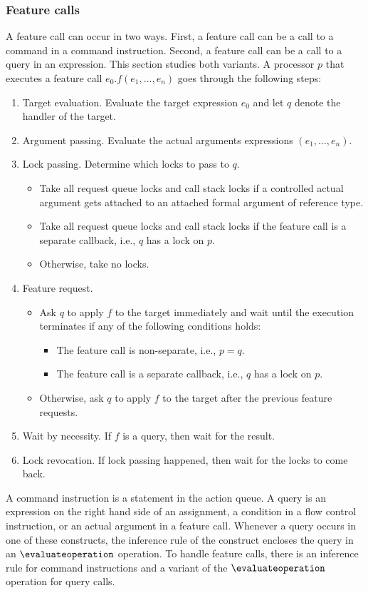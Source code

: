 \subsubsection{Feature calls}\label{sec:feature calls}
A feature call can occur in two ways. First, a feature call can be a call to a command in a command instruction. Second, a feature call can be a call to a query in an expression. This section studies both variants. A processor $p$ that executes a feature call $e_{0}.f(e_{1}, \ldots, e_{n})$ goes through the following steps:
\begin{enumerate}
	\item Target evaluation. Evaluate the target expression $e_{0}$ and let $q$ denote the handler of the target.
	\item Argument passing. Evaluate the actual arguments expressions $(e_{1}, \ldots, e_{n})$.
	\item Lock passing. Determine which locks to pass to $q$.
		\begin{itemize}
			\item Take all request queue locks and call stack locks if a controlled actual argument gets attached to an attached formal argument of reference type.
			\item Take all request queue locks and call stack locks if the feature call is a separate callback, i.e., $q$ has a lock on $p$.
			\item Otherwise, take no locks.
		\end{itemize}
	\item Feature request.
		\begin{itemize}
			\item Ask $q$ to apply $f$ to the target immediately and wait until the execution terminates if any of the following conditions holds:
				\begin{itemize}
					\item The feature call is non-separate, i.e., $p = q$.
					\item The feature call is a separate callback, i.e., $q$ has a lock on $p$.
				\end{itemize}
			\item Otherwise, ask $q$ to apply $f$ to the target after the previous feature requests.
		\end{itemize}
	\item Wait by necessity. If $f$ is a query, then wait for the result.
	\item Lock revocation. If lock passing happened, then wait for the locks to come back.
\end{enumerate}
A command instruction is a statement in the action queue. A query is an expression on the right hand side of an assignment, a condition in a flow control instruction, or an actual argument in a feature call. Whenever a query occurs in one of these constructs, the inference rule of the construct encloses the query in an $\evaluateoperation$ operation. To handle feature calls, there is an inference rule for command instructions and a variant of the $\evaluateoperation$ operation for query calls.

